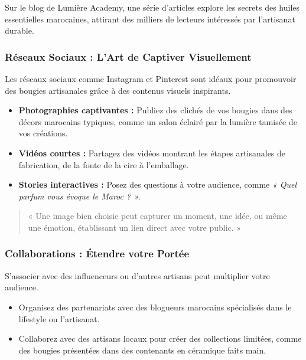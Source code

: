 \documentclass[11pt,fleqn,onecolumn,oneside]{book}
\begin{document}
\begin{example}
Sur le blog de Lumière Academy, une série d’articles explore les secrets des huiles essentielles marocaines, attirant des milliers de lecteurs intéressés par l’artisanat durable.
\end{example}

\subsubsection*{Réseaux Sociaux : L’Art de Captiver Visuellement}

Les réseaux sociaux comme Instagram et Pinterest sont idéaux pour promouvoir des bougies artisanales grâce à des contenus visuels inspirants.

\begin{itemize}
    \item \textbf{Photographies captivantes :} Publiez des clichés de vos bougies dans des décors marocains typiques, comme un salon éclairé par la lumière tamisée de vos créations.
    \item \textbf{Vidéos courtes :} Partagez des vidéos montrant les étapes artisanales de fabrication, de la fonte de la cire à l’emballage.
    \item \textbf{Stories interactives :} Posez des questions à votre audience, comme \textit{« Quel parfum vous évoque le Maroc ? »}.
\end{itemize}

\begin{quote}
« Une image bien choisie peut capturer un moment, une idée, ou même une émotion, établissant un lien direct avec votre public. »
\end{quote}

\subsubsection*{Collaborations : Étendre votre Portée}

S’associer avec des influenceurs ou d’autres artisans peut multiplier votre audience. 

\begin{itemize}
    \item Organisez des partenariats avec des blogueurs marocains spécialisés dans le lifestyle ou l’artisanat.
    \item Collaborez avec des artisans locaux pour créer des collections limitées, comme des bougies présentées dans des contenants en céramique faits main.
\end{itemize}
\end{document}
